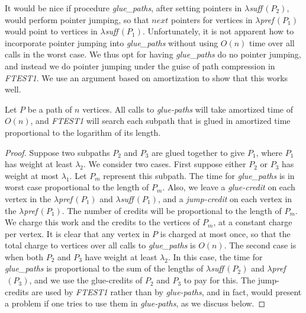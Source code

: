 {{{\dspace

It would be nice if procedure {\it glue\_paths},
after setting pointers in $\lambda${\it suff}$\,(P_2)$,
would perform pointer jumping,
so that $next$ pointers for vertices in $\lambda${\it pref}$\,(P_1)$
would point to vertices in $\lambda${\it suff}$\,(P_1)$. 
Unfortunately, it is not apparent how to incorporate pointer jumping into {\it glue\_paths} without using $O(n)$ time over all calls in the worst case. 
We thus opt for having {\it glue\_paths} do no pointer jumping,
and instead we do pointer jumping under the guise of path
compression in {\it FTEST1}.
We use an argument based on amortization to show that this works well.
\bigskip

\begin{lemma}
\label{lem:3:1}
Let $P$ be a path of $n$ vertices.
All calls to {\it glue-paths} will take amortized time of $O(n)$,
and {\it FTEST1} will search each subpath that is glued
in amortized time proportional to the logarithm of its length.
\end{lemma}
\begin{proof}
Suppose two subpaths $P_2$ and $P_3$ are glued together to give $P_1$,
where $P_1$ has weight at least $\lambda_2$.
We consider two cases.
First suppose either $P_2$ or $P_3$ has weight at most $\lambda_1$.
Let $P_m$ represent this subpath.
The time for {\it glue\_paths} is in worst case proportional
to the length of $P_m$.
Also, we leave a {\it glue-credit}
on each vertex in the $\lambda${\it pref}$\,(P_1)$ and $\lambda${\it suff}$\,(P_1)$,
and a {\it jump-credit} on each vertex in the $\lambda${\it pref}$\,(P_1)$.
The number of credits will be proportional to the length of $P_m$.
We charge this work and the credits to the vertices of $P_m$,
at a constant charge per vertex.
It is clear that any vertex in $P$ is charged at most once,
so that the total charge to vertices over all calls to {\it glue\_paths}
is $O(n)$.
The second case is when both $P_2$ and $P_3$ have weight at least $\lambda_2$.
In this case, the time for {\it glue\_paths} is proportional to the sum
of the lengths of $\lambda${\it suff}$\,(P_2)$
and $\lambda${\it pref}$\,(P_3)$,
and we use the glue-credits of $P_2$ and $P_3$ to pay for this.
The jump-credits are used by {\it FTEST1} rather than by {\it glue-paths},
and in fact, would present a problem if one tries to use them in {\it glue-paths}, as we discuss below.


\end{proof}}}}
